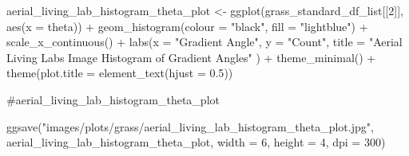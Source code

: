 \documentclass[
  letterpaper,
  DIV=11,
  numbers=noendperiod]{scrreprt}
\newenvironment{Shaded}{\begin{snugshade}}{\end{snugshade}}
\newcommand{\AttributeTok}[1]{\textcolor[rgb]{0.40,0.45,0.13}{#1}}
\newcommand{\CommentTok}[1]{\textcolor[rgb]{0.37,0.37,0.37}{#1}}
\newcommand{\DecValTok}[1]{\textcolor[rgb]{0.68,0.00,0.00}{#1}}
\newcommand{\FloatTok}[1]{\textcolor[rgb]{0.68,0.00,0.00}{#1}}
\newcommand{\FunctionTok}[1]{\textcolor[rgb]{0.28,0.35,0.67}{#1}}
\newcommand{\NormalTok}[1]{\textcolor[rgb]{0.00,0.23,0.31}{#1}}
\newcommand{\OtherTok}[1]{\textcolor[rgb]{0.00,0.23,0.31}{#1}}
\newcommand{\SpecialCharTok}[1]{\textcolor[rgb]{0.37,0.37,0.37}{#1}}
\newcommand{\StringTok}[1]{\textcolor[rgb]{0.13,0.47,0.30}{#1}}
\begin{document}
\begin{Shaded}
\begin{Highlighting}[]
\NormalTok{aerial\_living\_lab\_histogram\_theta\_plot }\OtherTok{\textless{}{-}}
  \FunctionTok{ggplot}\NormalTok{(grass\_standard\_df\_list[[}\DecValTok{2}\NormalTok{]], }
         \FunctionTok{aes}\NormalTok{(}\AttributeTok{x =}\NormalTok{ theta)) }\SpecialCharTok{+}
  \FunctionTok{geom\_histogram}\NormalTok{(}\AttributeTok{colour =} \StringTok{"black"}\NormalTok{, }\AttributeTok{fill =} \StringTok{"lightblue"}\NormalTok{) }\SpecialCharTok{+}
  \FunctionTok{scale\_x\_continuous}\NormalTok{() }\SpecialCharTok{+} 
  \FunctionTok{labs}\NormalTok{(}\AttributeTok{x =} \StringTok{"Gradient Angle"}\NormalTok{, }
       \AttributeTok{y =} \StringTok{"Count"}\NormalTok{, }
       \AttributeTok{title =} \StringTok{"Aerial Living Labs Image Histogram of Gradient Angles"}
\NormalTok{       ) }\SpecialCharTok{+}
  \FunctionTok{theme\_minimal}\NormalTok{() }\SpecialCharTok{+}
  \FunctionTok{theme}\NormalTok{(}\AttributeTok{plot.title =} \FunctionTok{element\_text}\NormalTok{(}\AttributeTok{hjust =} \FloatTok{0.5}\NormalTok{))}

\CommentTok{\#aerial\_living\_lab\_histogram\_theta\_plot}

\FunctionTok{ggsave}\NormalTok{(}\StringTok{"images/plots/grass/aerial\_living\_lab\_histogram\_theta\_plot.jpg"}\NormalTok{, }
\NormalTok{       aerial\_living\_lab\_histogram\_theta\_plot, }\AttributeTok{width =} \DecValTok{6}\NormalTok{, }\AttributeTok{height =} \DecValTok{4}\NormalTok{, }\AttributeTok{dpi =} \DecValTok{300}\NormalTok{)}
\end{Highlighting}
\end{Shaded}
\end{document}
